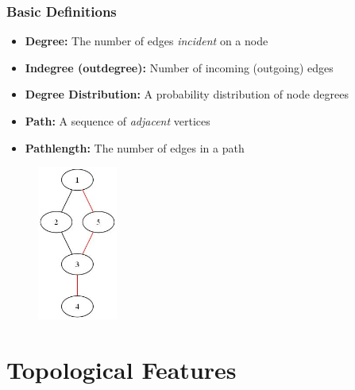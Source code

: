 \documentclass{beamer}
\begin{document}
				\frame
				{
					\frametitle{Basic Definitions}
					\begin{itemize}
						\item<1-> {\textbf{Degree:} The number of edges \textit{incident} on a node}
						\item<1-> {\textbf{Indegree (outdegree):} Number of incoming (outgoing) edges}
						\item<2-> {\textbf{Degree Distribution:} A probability distribution of node degrees}
					\end{itemize}
				}
			
				\frame
				{
					\begin{itemize}
					\item<1-> {\textbf{Path:} A sequence of \textit{adjacent} vertices}
					\item<1-> {\textbf{Pathlength:} The number of edges in a path}
					\end{itemize}
				
					\begin{centering}			
					\begin{figure}
						\includegraphics[height=2in]{graph.jpg}
					\end{figure}
					\end{centering}					
					
				}

\section{Topological Features}
\end{document}
